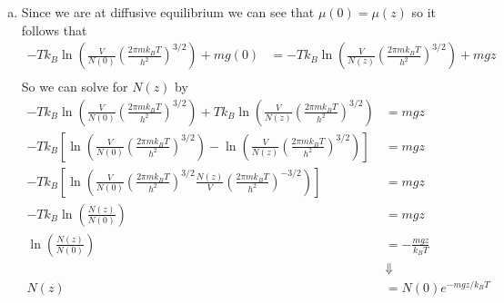 \documentclass[11pt]{article}
\numberwithin{equation}{section}
\begin{document}
\begin{enumerate}[(a)]
\item
Since we are at diffusive equilibrium we can see that $\mu(0) = \mu(z)$
so it follows that
\begin{align*}
-Tk_B\ln\left(\frac{V}{N(0)}\left(\frac{2\pi mk_BT}{h^2}\right)^{3/2}\right) + mg(0) &= -Tk_B\ln\left(\frac{V}{N(z)}\left(\frac{2\pi mk_BT}{h^2}\right)^{3/2}\right) + mgz\\
\end{align*}
So we can solve for $N(z)$ by
\begin{align*}
-Tk_B\ln\left(\frac{V}{N(0)}\left(\frac{2\pi mk_BT}{h^2}\right)^{3/2}\right) + Tk_B\ln\left(\frac{V}{N(z)}\left(\frac{2\pi mk_BT}{h^2}\right)^{3/2}\right) &= mgz\\
-Tk_B\left[\ln\left(\frac{V}{N(0)}\left(\frac{2\pi mk_BT}{h^2}\right)^{3/2}\right) - \ln\left(\frac{V}{N(z)}\left(\frac{2\pi mk_BT}{h^2}\right)^{3/2}\right)\right] &= mgz\\
-Tk_B\left[\ln\left(\frac{V}{N(0)}\left(\frac{2\pi mk_BT}{h^2}\right)^{3/2}\frac{N(z)}{V}\left(\frac{2\pi mk_BT}{h^2}\right)^{-3/2}\right)\right] &= mgz\\
-Tk_B\ln\left(\frac{N(z)}{N(0)}\right) &= mgz\\
\ln\left(\frac{N(z)}{N(0)}\right) &= -\frac{mgz}{k_BT}\\
&\Downarrow\\
N(z) &= N(0)e^{-mgz/k_BT}
\end{align*}
\end{enumerate}
\end{document}
